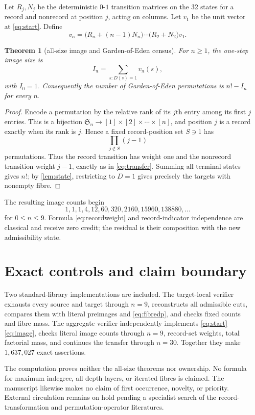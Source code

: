 \documentclass[10pt,a4paper]{amsart}
\newtheorem{theorem}{Theorem}[section]
\theoremstyle{definition}
\theoremstyle{remark}
\newcommand{\Sn}{\mathfrak S}
\begin{document}
Let \(R_j,N_j\) be the deterministic \(0\)-\(1\) transition matrices on the
32 states for a record and nonrecord at position \(j\), acting on columns.
Let \(v_1\) be the unit vector at \eqref{eq:start}.  Define
\[
 v_n=\bigl(R_n+(n-1)N_n\bigr)\cdots
       \bigl(R_2+N_2\bigr)v_1.                             \tag{4.5}\label{eq:transfer}
\]

\begin{theorem}[all-size image and Garden-of-Eden census]\label{thm:image}
For \(n\ge1\), the one-step image size is
\[
                         I_n=\sum_{s:D(s)=1}v_n(s),         \tag{4.6}\label{eq:image}
\]
with \(I_0=1\).  Consequently the number of Garden-of-Eden permutations is
\(n!-I_n\) for every \(n\).
\end{theorem}

\begin{proof}
Encode a permutation by the relative rank of its \(j\)th entry among its
first \(j\) entries.  This is a bijection
\(\Sn_n\to[1]\times[2]\times\cdots\times[n]\), and position \(j\) is a
record exactly when its rank is \(j\).  Hence a fixed
record-position set \(S\ni1\) has
\[
                 \prod_{j\notin S}(j-1)                   \tag{4.7}\label{eq:recordweight}
\]
permutations.  Thus the record transition has weight one and the nonrecord
transition weight \(j-1\), exactly as in \eqref{eq:transfer}.  Summing all terminal
states gives \(n!\); by \cref{lem:state}, restricting to \(D=1\) gives
precisely the targets with nonempty fibre.
\end{proof}

The resulting image counts begin
\[
             1,1,1,4,12,60,320,2160,15960,138880,\ldots   \tag{4.8}
\]
for \(0\le n\le9\).  Formula \eqref{eq:recordweight} and record-indicator independence
are classical and receive zero credit; the residual is their composition
with the new admissibility state.

\section{Exact controls and claim boundary}

Two standard-library implementations are included.  The target-local
verifier exhausts every source and target through \(n=9\), reconstructs all
admissible cuts, compares them with literal preimages and \eqref{eq:fibredp}, and
checks fixed counts and fibre mass.  The aggregate verifier independently
implements \eqref{eq:start}--\eqref{eq:image}, checks literal image counts through
\(n=9\), record-set weights, total factorial mass, and continues the transfer
through \(n=30\).  Together they make \(1{,}637{,}027\) exact assertions.

The computation proves neither the all-size theorems nor ownership.  No
formula for maximum indegree, all depth layers, or iterated fibres is
claimed.  The manuscript likewise makes no claim of first occurrence,
novelty, or priority.  External circulation remains on hold pending a
specialist search of the record-transformation and permutation-operator
literatures.



\end{document}
